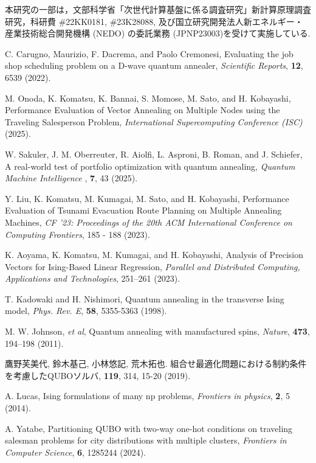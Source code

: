 \documentclass[submit,techrep,noauthor]{ipsj}
\begin{document}
\begin{acknowledgment}
本研究の一部は，文部科学省「次世代計算基盤に係る調査研究」新計算原理調査研究，科研費 \#22KK0181, \#23K28088, 及び国立研究開発法人新エネルギー・産業技術総合開発機構 (NEDO) の委託業務 (JPNP23003)を受けて実施している.
\end{acknowledgment}

\begin{thebibliography}{10}

C. Carugno, Maurizio, F. Dacrema, and Paolo Cremonesi, Evaluating the job shop scheduling problem on a D-wave quantum annealer, {\it Scientific Reports}, {\bf 12}, 6539 (2022).

M. Onoda, K. Komatsu, K. Bannai, S. Momose, M. Sato, and H. Kobayashi, Performance Evaluation of Vector Annealing  on Multiple Nodes using  the Traveling Salesperson Problem, {\it International Supercomputing Conference (ISC)} (2025).

W. Sakuler, J. M. Oberreuter, R. Aiolfi, L. Asproni, B. Roman, and J. Schiefer, A real-world test of portfolio optimization with quantum annealing, {\it Quantum Machine Intelligence }, {\bf 7}, 43 (2025).

Y. Liu, K. Komatsu, M. Kumagai, M. Sato, and H. Kobayashi, Performance Evaluation of Tsunami Evacuation Route Planning on Multiple Annealing Machines, {\it CF '23: Proceedings of the 20th ACM International Conference on Computing Frontiers}, 185 - 188 (2023).

K. Aoyama, K. Komatsu, M. Kumagai, and H. Kobayashi, Analysis of Precision Vectors for Ising-Based Linear Regression, {\it Parallel and Distributed Computing, Applications and Technologies}, 251–261 (2023).

T. Kadowaki and H. Nishimori, Quantum annealing in the transverse Ising model, {\it Phys. Rev. E}, {\bf 58}, 5355-5363 (1998).

M. W. Johnson, {\it et al}, Quantum annealing with manufactured spins, {\it Nature}, {\bf 473}, 194–198 (2011).

鷹野芙美代, 鈴木基己, 小林悠記, 荒木拓也. 組合せ最適化問題における制約条件を考慮したQUBOソルバ, {\bf 119}, 314, 15-20 (2019).

A. Lucas, Ising formulations of many np problems, {\it Frontiers in physics}, {\bf 2}, 5 (2014).

A. Yatabe, Partitioning QUBO with two-way one-hot conditions on traveling salesman problems for city distributions with multiple clusters, {\it Frontiers in Computer Science}, {\bf 6}, 1285244 (2024).


\end{thebibliography}
\end{document}
